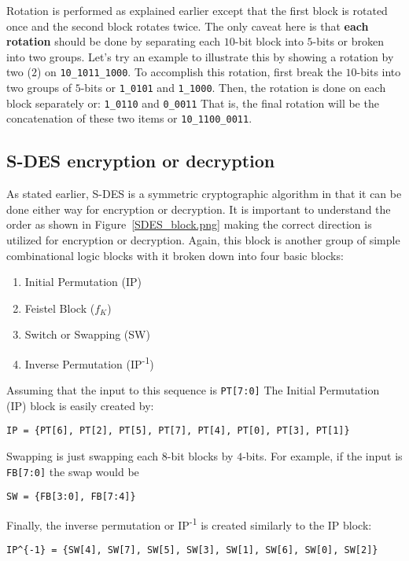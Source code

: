 \documentclass{article}
\begin{document}
Rotation is performed as explained earlier except that the first block is
rotated once and the second block rotates twice.  The only caveat here
is that \textbf{each rotation} should be done by separating each
$10$-bit block
into $5$-bits or broken into two groups.  Let's try an example to
illustrate this by showing a rotation by two ($2$) on \verb!10_1011_1000!.
To accomplish this rotation, first break the $10$-bits into two groups
of $5$-bits or \verb!1_0101! and \verb!1_1000!.   Then, the rotation
is done on each block separately or:  \verb!1_0110! and \verb!0_0011!
That is, the final rotation will be the concatenation of these two
items or \verb!10_1100_0011!.

\subsection{S-DES encryption or decryption}

As stated earlier, S-DES is a symmetric cryptographic algorithm in
that it can be done either way for encryption or decryption.  It is
important to understand the order as shown in
Figure~\ref{SDES_block.png} making the correct direction is utilized
for encryption or decryption.  Again, this block is another group of simple
combinational logic blocks with it broken down into four basic
blocks:
\begin{enumerate}
\item Initial Permutation (IP)
\item Feistel Block ($f_K$)
\item Switch or Swapping (SW)
\item Inverse Permutation (IP\textsuperscript{-1})
\end{enumerate}

Assuming that the input to this sequence is \verb!PT[7:0]!
The Initial Permutation (IP) block is easily created by:
\begin{verbatim}
IP = {PT[6], PT[2], PT[5], PT[7], PT[4], PT[0], PT[3], PT[1]}
\end{verbatim}
Swapping is just swapping each $8$-bit blocks by $4$-bits.  For
example, if the input is \verb!FB[7:0]! the swap would be
\begin{verbatim}
SW = {FB[3:0], FB[7:4]}
\end{verbatim}
Finally, the inverse permutation or IP\textsuperscript{-1} is created
similarly to the IP block:
\begin{verbatim}
IP^{-1} = {SW[4], SW[7], SW[5], SW[3], SW[1], SW[6], SW[0], SW[2]}
\end{verbatim}
\end{document}
